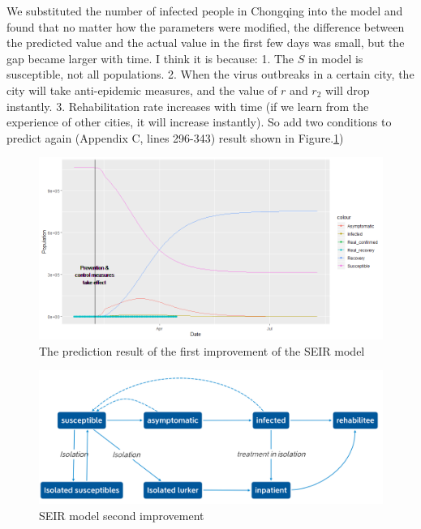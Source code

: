 \documentclass[a4paper, 11pt,twoside=true]{scrartcl}
\begin{document}
\quad We substituted the number of infected people in Chongqing into the model and found that no matter how the parameters were modified, the difference between the predicted value and the actual value in the first few days was small, but the gap became larger with time. I think it is because: 1. The $S$  in model is susceptible, not all populations. 2. When the virus outbreaks in a certain city, the city will take anti-epidemic measures, and the value of $r$ and $r_2$ will drop instantly. 3. Rehabilitation rate increases with time (if we learn from the experience of other cities, it will increase instantly). So add two conditions to predict again (Appendix C, lines 296-343) result shown in Figure.\ref{P3F7})\\
\vspace{-0.5cm}
\begin{figure}[H]
	\small
	\centering
	\includegraphics[width=12cm]{P3F7}
	\caption{The prediction result of the first improvement of the SEIR model} \label{P3F7}
\end{figure}

\begin{figure}[H]
	\small
	\centering
	\includegraphics[width=14cm]{E5}
	\caption{SEIR model second improvement} \label{C5}
\end{figure}
\end{document}
